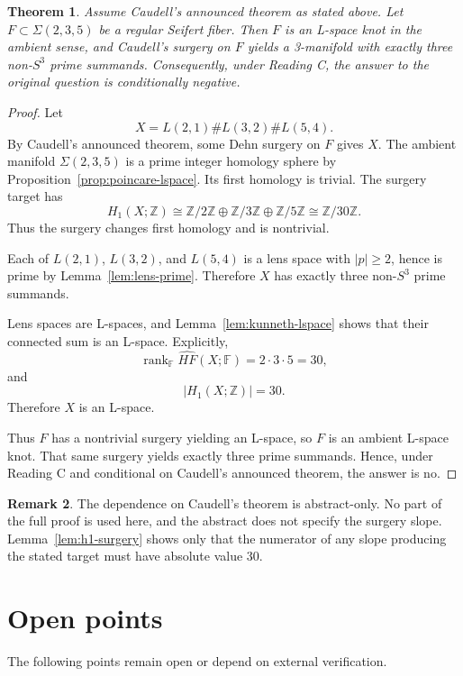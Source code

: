 \documentclass[12pt]{article}
\newtheorem{theorem}{Theorem}[section]
\theoremstyle{definition}
\newtheorem{remark}[theorem]{Remark}
\newcommand{\Z}{\mathbb Z}
\newcommand{\F}{\mathbb F}
\newcommand{\HFhat}{\widehat{HF}}
\DeclareMathOperator{\rank}{rank}
\begin{document}
\begin{theorem}\label{thm:reading-c}
Assume Caudell's announced theorem as stated above.  Let \(F\subset \Sigma(2,3,5)\) be a regular Seifert fiber.  Then \(F\) is an L-space knot in the ambient sense, and Caudell's surgery on \(F\) yields a 3-manifold with exactly three non-\(S^3\) prime summands.  Consequently, under Reading C, the answer to the original question is conditionally negative.
\end{theorem}

\begin{proof}
Let
\[
X=L(2,1)\# L(3,2)\# L(5,4).
\]
By Caudell's announced theorem, some Dehn surgery on \(F\) gives \(X\).
The ambient manifold \(\Sigma(2,3,5)\) is a prime integer homology sphere by Proposition~\ref{prop:poincare-lspace}.  Its first homology is trivial.  The surgery target has
\[
H_1(X;\Z)\cong
\Z/2\Z\oplus \Z/3\Z\oplus \Z/5\Z
\cong \Z/30\Z.
\]
Thus the surgery changes first homology and is nontrivial.

Each of \(L(2,1)\), \(L(3,2)\), and \(L(5,4)\) is a lens space with \(|p|\ge 2\), hence is prime by Lemma~\ref{lem:lens-prime}.  Therefore \(X\) has exactly three non-\(S^3\) prime summands.

Lens spaces are L-spaces, and Lemma~\ref{lem:kunneth-lspace} shows that their connected sum is an L-space.  Explicitly,
\[
\rank_{\F}\HFhat(X;\F)=2\cdot 3\cdot 5=30,
\]
and
\[
|H_1(X;\Z)|=30.
\]
Therefore \(X\) is an L-space.

Thus \(F\) has a nontrivial surgery yielding an L-space, so \(F\) is an ambient L-space knot.  That same surgery yields exactly three prime summands.  Hence, under Reading C and conditional on Caudell's announced theorem, the answer is no.
\end{proof}

\begin{remark}
The dependence on Caudell's theorem is abstract-only.  No part of the full proof is used here, and the abstract does not specify the surgery slope.  Lemma~\ref{lem:h1-surgery} shows only that the numerator of any slope producing the stated target must have absolute value \(30\).
\end{remark}

\section{Open points}
\label{sec:open}
The following points remain open or depend on external verification.
\end{document}
